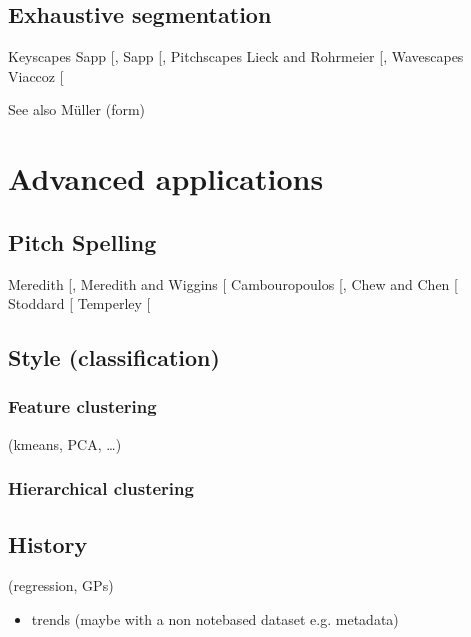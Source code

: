 \documentclass[letterpaper,10pt,english]{sphinxmanual}
\begin{document}
\section{Exhaustive segmentation}
\label{\detokenize{5_segmentation:exhaustive-segmentation}}
Keyscapes Sapp {[}\sphinxcite{8_bibliography:id16}{]}, Sapp {[}\sphinxcite{8_bibliography:id17}{]},
Pitchscapes Lieck and Rohrmeier {[}\sphinxcite{8_bibliography:id15}{]},
Wavescapes Viaccoz  {[}\sphinxcite{8_bibliography:id18}{]}

See also Müller (form)


\chapter{Advanced applications}
\label{\detokenize{6_advanced:advanced-applications}}\label{\detokenize{6_advanced::doc}}

\section{Pitch Spelling}
\label{\detokenize{6_advanced:pitch-spelling}}\label{\detokenize{6_advanced:id1}}
Meredith {[}\sphinxcite{8_bibliography:id10}{]}, Meredith and Wiggins {[}\sphinxcite{8_bibliography:id9}{]}
Cambouropoulos {[}\sphinxcite{8_bibliography:id11}{]}, Chew and Chen {[}\sphinxcite{8_bibliography:id12}{]}
Stoddard  {[}\sphinxcite{8_bibliography:id13}{]}
Temperley {[}\sphinxcite{8_bibliography:id14}{]}


\section{Style (classification)}
\label{\detokenize{6_advanced:style-classification}}

\subsection{Feature clustering}
\label{\detokenize{6_advanced:feature-clustering}}
(k\sphinxhyphen{}means, PCA, …)


\subsection{Hierarchical clustering}
\label{\detokenize{6_advanced:hierarchical-clustering}}

\section{History}
\label{\detokenize{6_advanced:history}}
(regression, GPs)
\begin{itemize}
\item {} 
trends (maybe with a non note\sphinxhyphen{}based dataset e.g. metadata)

\end{itemize}
\end{document}
